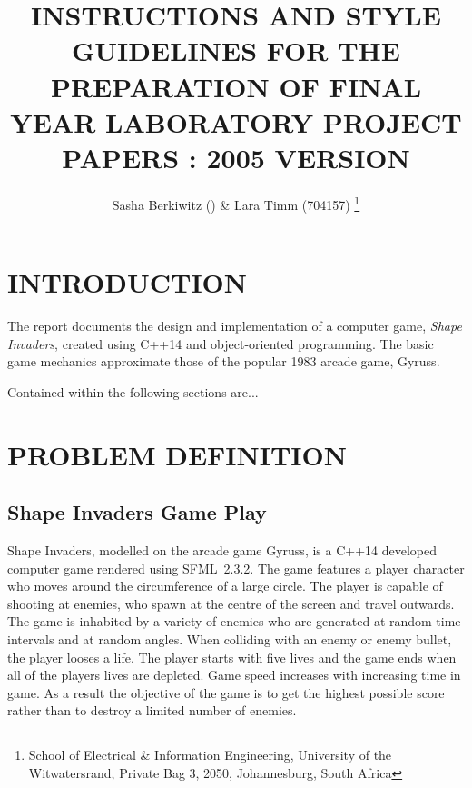 \documentclass[10pt,twocolumn]{witseiepaper}
\begin{document}
\title{INSTRUCTIONS AND STYLE GUIDELINES FOR THE PREPARATION OF FINAL YEAR LABORATORY PROJECT PAPERS : 2005 VERSION}

\author{Sasha Berkiwitz () \& Lara Timm (704157)
\thanks{School of Electrical \& Information Engineering, University of the
Witwatersrand, Private Bag 3, 2050, Johannesburg, South Africa}
}


%
\abstract{}

\keywords{}


\maketitle
\thispagestyle{empty}
\pagestyle{plain}
\setcounter{page}{1}


\section{INTRODUCTION}

The report documents the design and implementation of a computer game, \textit{Shape Invaders}, created using C++14 and object-oriented programming. The basic game mechanics approximate those of the popular 1983 arcade game, Gyruss. 

Contained within the following sections are...

\section{PROBLEM DEFINITION}\label{probDef}


\subsection{Shape Invaders Game Play}

Shape Invaders, modelled on the arcade game Gyruss, is a C++14 developed computer game rendered using SFML~2.3.2. The game features a player character who moves around the circumference of a large circle. The player is capable of shooting at enemies, who spawn at the centre of the screen and travel outwards. The game is inhabited by a variety of enemies who are generated at random time intervals and at random angles. When colliding with an enemy or enemy bullet, the player looses a life. The player starts with five lives and the game ends when all of the players lives are depleted. Game speed increases with increasing time in game. As a result the objective of the game is to get the highest possible score rather than to destroy a limited number of enemies.
\end{document}
